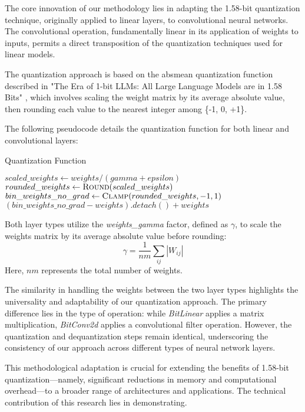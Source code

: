 \documentclass{article}
\begin{document}
The core innovation of our methodology lies in adapting the 1.58-bit quantization technique, originally applied to linear layers, to convolutional neural networks. The convolutional operation, fundamentally linear in its application of weights to inputs, permits a direct transposition of the quantization techniques used for linear models.

The quantization approach is based on the absmean quantization function described in "The Era of 1-bit LLMs: All Large Language Models are in 1.58 Bits" \cite{ma2024era}, which involves scaling the weight matrix by its average absolute value, then rounding each value to the nearest integer among \{-1, 0, +1\}.

The following pseudocode details the quantization function for both linear and convolutional layers:
\begin{algorithm}
  \caption{Quantization Function}
  \begin{algorithmic}[1]
      \State $scaled\_weights \gets weights / (gamma + epsilon)$
      \State $rounded\_weights \gets \Call{Round}{scaled\_weights}$
      \State $bin\_weights\_no\_grad \gets \Call{Clamp}{rounded\_weights, -1, 1}$
      \State \Return $(bin\_weights\_no\_grad - weights).detach() + weights$
  \EndFunction
  \end{algorithmic}
  \end{algorithm}


Both layer types utilize the \textit{weights\_gamma} factor, defined as $\gamma$, to scale the weights matrix by its average absolute value before rounding:
\[
\gamma = \frac{1}{nm} \sum_{ij} |W_{ij}| \tag{3}
\]
Here, $nm$ represents the total number of weights.

The similarity in handling the weights between the two layer types highlights the universality and adaptability of our quantization approach. The primary difference lies in the type of operation: while \textit{BitLinear} applies a matrix multiplication, \textit{BitConv2d} applies a convolutional filter operation. However, the quantization and dequantization steps remain identical, underscoring the consistency of our approach across different types of neural network layers.

This methodological adaptation is crucial for extending the benefits of 1.58-bit quantization—namely, significant reductions in memory and computational overhead—to a broader range of architectures and applications. The technical contribution of this research lies in demonstrating.
\end{document}

